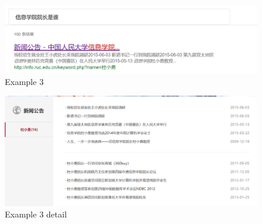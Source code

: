 \documentclass{article}
\begin{document}
\begin{figure}[h!]
\flushleft
\includegraphics[width=15cm]{yuanzhang.png}
\caption{Example 3}
\end{figure}
\begin{figure}[h!]
\flushleft
\includegraphics[width=12.5cm]{yuanzhang_detail.png}
\caption{Example 3 detail}
\end{figure}
\end{document}
